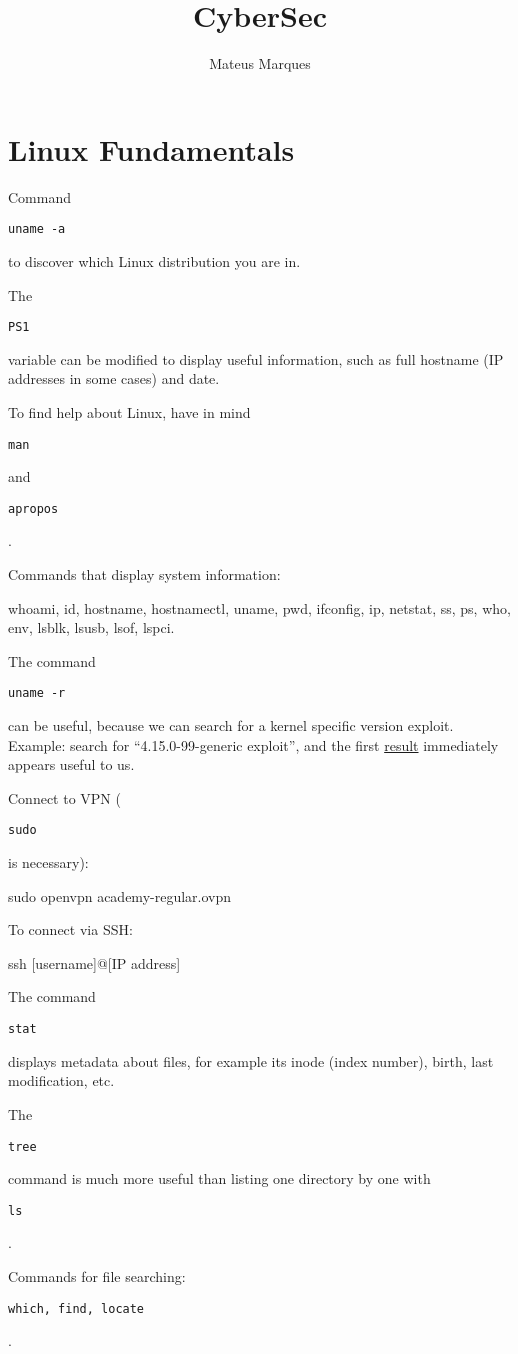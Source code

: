 \documentclass[a4paper,12pt]{article}
\title{\Huge{\textbf{CyberSec}}}
\author{Mateus Marques}
\newcommand{\bashinline}[1]{%
\colorbox{bashcodebg}{%
\parbox[b][0.6em]{\widthof{\texttt{#1}}}{\texttt{#1}}%
}%
}
\begin{document}
\maketitle

\section{Linux Fundamentals}

Command \bashinline{uname -a} to discover which Linux distribution you are in.

\n

The \bashinline{PS1} variable can be modified to display useful information, such as full hostname (IP addresses in some cases) and date.

\n

To find help about Linux, have in mind \bashinline{man} and \bashinline{apropos}.

\n

Commands that display system information:
\begin{bash}
whoami, id, hostname, hostnamectl, uname, pwd, ifconfig, ip, netstat,
ss, ps, who, env, lsblk, lsusb, lsof, lspci.
\end{bash}

The command \bashinline{uname -r} can be useful, because we can search for a kernel specific version exploit. Example: search for ``4.15.0-99-generic exploit'', and the first \href{https://www.exploit-db.com/exploits/47163}{result} immediately appears useful to us.

\n

Connect to VPN (\bashinline{sudo} is necessary):
\begin{bash}
sudo openvpn academy-regular.ovpn
\end{bash}

To connect via SSH:
\begin{bash}
ssh [username]@[IP address]
\end{bash}

The command \bashinline{stat} displays metadata about files, for example its inode (index number), birth, last modification, etc.

\n

The \bashinline{tree} command is much more useful than listing one directory by one with \bashinline{ls}.

\n

Commands for file searching: \bashinline{which, find, locate}.

\n
\end{document}
